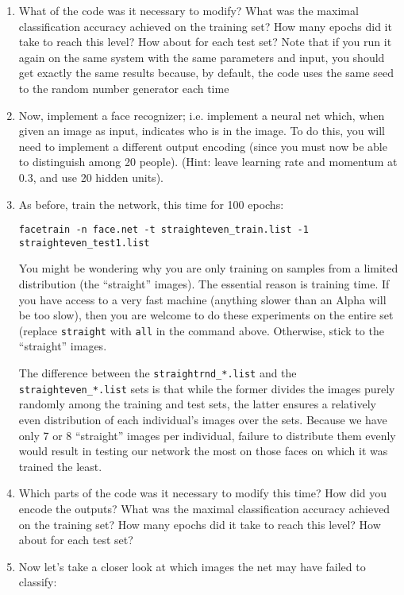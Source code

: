 \begin{enumerate}
\item What of the code was it necessary to modify?  What was the
maximal classification accuracy achieved on the training set?  How
many epochs did it take to reach this level?  How about for each
test set?  Note that if you run it again on the same system with the
same parameters and input, you should get exactly the same results
because, by default, the code uses the same seed to the random number
generator each time

\item Now, implement a face recognizer; i.e. implement a neural net which,
when given an image as input, indicates who is in the image.  To do this,
you will need to implement a different output encoding (since you must
now be able to distinguish among 20 people).  (Hint: leave learning rate
and momentum at 0.3, and use 20 hidden units).

\item As before, train the network, this time for 100 epochs:

{\tt facetrain -n face.net -t straighteven\_train.list -1 straighteven\_test1.list}

You might be wondering why you are only training on samples from a limited
distribution (the ``straight'' images).  The essential reason is training
time.  If you have access to a very fast machine (anything slower than
an Alpha will be too slow), then you are welcome to do these experiments
on the entire set (replace {\tt straight} with {\tt all} in the command
above.  Otherwise, stick to the ``straight'' images.

The difference between the {\tt straightrnd\_*.list} and the {\tt
straighteven\_*.list} sets is that while the former divides the images purely
randomly among the training and test sets, the latter ensures a relatively
even distribution of each individual's images over the sets.  Because we have
only 7 or 8 ``straight'' images per individual, failure to distribute them
evenly would result in testing our network the most on those faces on which it
was trained the least.

\item Which parts of the code was it necessary to modify this time?
How did you encode the outputs?
What was the maximal classification accuracy achieved on the training set?
How many epochs did it take to reach this level?  How about for each
test set?

\item Now let's take a closer look at which images the net may have failed
to classify:


\end{enumerate}
